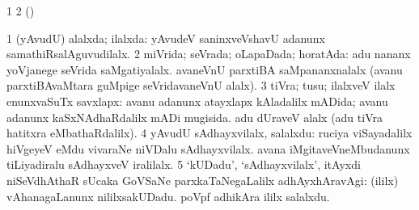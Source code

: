 \bentry
{}
\gl{\saMkiSx}
\bmng
\bnum
\num{1}  
\num{2} (\ame)  
\enum
\emng
\eentry

\bentry
{}
\gl{\gu}
\bmng
\bnum
\num{1} (yAvudU) alalxda; ilalxda:  yAvudeV saninxveVshavU adanunx samathiRsalAguvudilalx. 
\num{2} miVrida; seVrada; oLapaDada; horatAda:  adu nananx yoVjanege seVrida saMgatiyalalx.  avaneVnU parxtiBA saMpananxnalalx (avanu parxtiBAvaMtara guMpige seVridavaneVnU alalx). 
\num{3} tiVra; tusu; ilalxveV ilalx enunxvaSuTx savxlapx:  avanu adanunx atayxlapx kAladalilx mADida; avanu adanunx kaSxNAdhaRdalilx mADi mugisida.  adu dUraveV alalx (adu tiVra hatitxra eMbathaRdalilx). 
\num{4} yAvudU sAdhayxvilalx, salalxdu:  ruciya viSayadalilx hiVgeyeV eMdu vivaraNe niVDalu sAdhayxvilalx.  avana iMgitaveVneMbudanunx tiLiyadiralu sAdhayxveV iralilalx. 
\num{5} `kUDadu', `sAdhayxvilalx', itAyxdi niSeVdhAthaR sUcaka GoVSaNe parxkaTaNegaLalilx adhAyxhAravAgi:  (ililx) vAhanagaLanunx nililxsakUDadu.  poVpf adhikAra ililx salalxdu. 
\enum
\emng

